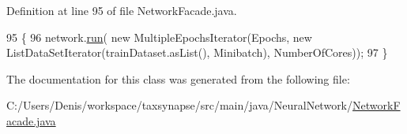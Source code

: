 Definition at line 95 of file Network\+Facade.\+java.


\begin{DoxyCode}
95                                                                         \{
96         network.\hyperlink{class_neural_network_1_1_neural_network_aaba587c903d93ae817db303eb9ab0ac9}{run}( \textcolor{keyword}{new} MultipleEpochsIterator(Epochs, \textcolor{keyword}{new} ListDataSetIterator(trainDataset.asList(), 
      Minibatch), NumberOfCores));
97     \}
\end{DoxyCode}


The documentation for this class was generated from the following file\+:\begin{DoxyCompactItemize}
\item 
C\+:/\+Users/\+Denis/workspace/taxsynapse/src/main/java/\+Neural\+Network/\hyperlink{_network_facade_8java}{Network\+Facade.\+java}\end{DoxyCompactItemize}
